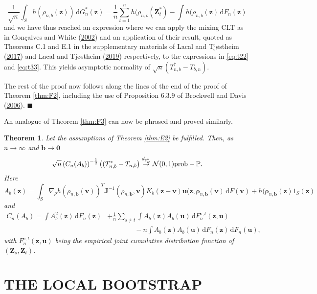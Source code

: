 \documentclass[
  12pt,
  letterpaper]{article}
\newtheorem{thm}{Theorem}[section]
\numberwithin{equation}{section}
\newcommand{\Z}{\bm{Z}}
\newcommand{\z}{\bm{z}}
\newcommand{\fv}{\bm{v}}
\newcommand{\fu}{\bm{u}}
\newcommand{\J}{\bm{J}}
\newcommand{\frho}{\bm{\rho}}
\newcommand{\bb}{\bm{b}}
\newcommand{\di}{\,\textrm{d}}
\begin{document}
\begin{equation}
\frac{1}{\sqrt{n}} \int_S h(\rho_{n,b}(\z)) \di G_n^*(\z) = \frac{1}{n}\sum_{t=1}^{n}h(\rho_{n,b}(\Z_t^{*}) - \int h(\rho_{n,b}(\z) \di F_n(\z)
\label{eq:t33}
\end{equation}
and we have thus reached an expression where we can apply the mixing CLT as in Gonçalves and White (\protect\hyperlink{ref-gonccalves2002bootstrap}{2002}) and an application of their result, quoted as Theorems C.1 and E.1 in the supplementary materials of Lacal and Tjøstheim (\protect\hyperlink{ref-lacal2017local}{2017}) and Lacal and Tjøstheim (\protect\hyperlink{ref-lacal2018estimating}{2019}) respectively, to the expressions in \eqref{eq:t22} and \eqref{eq:t33}. This yields asymptotic normality of \(\sqrt{n}(T_{n,b}^*-T_{b,n})\).

The rest of the proof now follows along the lines of the end of the proof of Theorem \ref{thm:F2}, including the use of Proposition 6.3.9 of Brockwell and Davis (\protect\hyperlink{ref-brockwell1991time}{2006}). \(\blacksquare\)

An analogue of Theorem \ref{thm:F3} can now be phrased and proved similarly.

\begin{thm}
Let the assumptions of Theorem \ref{thm:E2} be fulfilled. Then,
as $n \to \infty$ and $\bb \to \bm{0}$
$$
\sqrt{n}\left(C_{n}(A_b)\right)^{-\frac{1}{2}}\left((T_{n,b}^* - T_{n,b}\right) \buildrel {d_{\mathbb{P}_{\omega}^*}} \over {\to} {\cal N}(0,1)\mbox{prob}-\mathbb{P}.
$$
Here 
$$
A_b(\z) = \int_S \nabla_{\rho}h(\rho_{n,\bb}(\fv))^{T}{\J}^{-1}(\rho_{n,\bb},\fv)K_b(\z-\fv)\fu(\z,\frho_{n,\bb}(\fv) \di F(\fv) + h(\frho_{n,\bb}(\z)1_S(\z)
$$
and 
\begin{align*}
C_n(A_b) = \int A_b^2(\z) \di F_n(\z) &+ \frac{1}{n}\sum_{s \neq t}\int A_b(\z)A_b(\fu) \di F_n^{s,t}(\z,\fu) \\ & \qquad\qquad- n\int A_b(\z)A_b(\fu)\di F_n(\z) \di F_n(\fu),
\end{align*}
with $F_n^{s,t}(\z,\fu)$ being the empirical joint cumulative distribution function of $(\Z_s,\Z_t)$.
\label{thm:H2}
\end{thm}

\hypertarget{local-boot}{%
\section{THE LOCAL BOOTSTRAP}\label{local-boot}}
\end{document}
